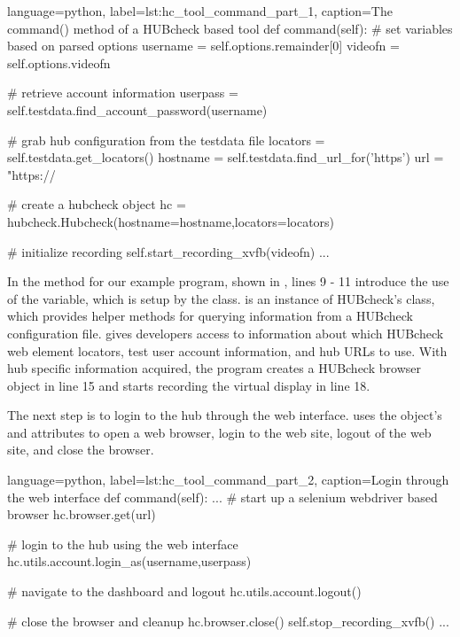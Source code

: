 \begin{xcode}{%
  language=python,%
  label=lst:hc_tool_command_part_1,%
  caption={The command() method of a HUBcheck based tool}%
}
    def command(self):
        # set variables based on parsed options
        username = self.options.remainder[0]
        videofn = self.options.videofn

        # retrieve account information
        userpass = self.testdata.find_account_password(username)

        # grab hub configuration from the testdata file
        locators    = self.testdata.get_locators()
        hostname    = self.testdata.find_url_for('https')
        url = "https://%

        # create a hubcheck object
        hc = hubcheck.Hubcheck(hostname=hostname,locators=locators)

        # initialize recording
        self.start_recording_xvfb(videofn)
        ...
\end{xcode}

In the  method for our example 
program, shown in , lines 9 - 11 introduce the
use of the  variable, which is setup by the
 class.   is an instance of
HUBcheck's  class, which provides helper methods for querying
information from a HUBcheck configuration file.  
gives developers access to information about which HUBcheck web element
locators, test user account information, and hub URLs to use. With hub specific
information acquired, the program creates a HUBcheck browser object in line 15
and starts recording the virtual display in line 18.

The next step is to login to the hub through the web interface.
 uses the  object's
 and  attributes to open a web browser,
login to the web site, logout of the web site, and close the browser.

\begin{xcode}{%
  language=python,%
  label=lst:hc_tool_command_part_2,%
  caption={Login through the web interface}%
}
    def command(self):
        ...
        # start up a selenium webdriver based browser
        hc.browser.get(url)

        # login to the hub using the web interface
        hc.utils.account.login_as(username,userpass)

        # navigate to the dashboard and logout
        hc.utils.account.logout()

        # close the browser and cleanup
        hc.browser.close()
        self.stop_recording_xvfb()
        ...
\end{xcode}

